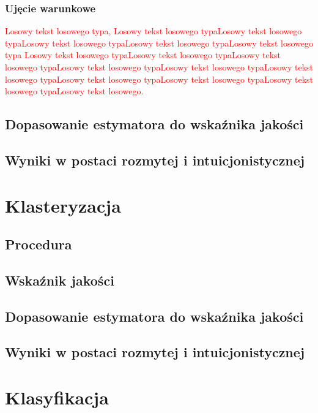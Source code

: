 \documentclass[12pt,a4paper,oneside]{book}
\theoremstyle{definition}
\begin{document}
\subsection*{Ujęcie warunkowe}

\textcolor{red}{Losowy tekst losowego typa, Losowy tekst losowego typaLosowy tekst losowego typaLosowy tekst losowego typaLosowy tekst losowego typaLosowy tekst losowego typa Losowy tekst losowego typaLosowy tekst losowego typaLosowy tekst losowego typaLosowy tekst losowego typaLosowy tekst losowego typaLosowy tekst losowego typaLosowy tekst losowego typaLosowy tekst losowego typaLosowy tekst losowego typaLosowy tekst losowego.}

\section{Dopasowanie estymatora do wskaźnika jakości}

\section{Wyniki w postaci rozmytej i intuicjonistycznej}

\chapter{Klasteryzacja}

\section{Procedura}

\section{Wskaźnik jakości}

\section{Dopasowanie estymatora do wskaźnika jakości}

\section{Wyniki w postaci rozmytej i intuicjonistycznej}

\chapter{Klasyfikacja}
\end{document}
